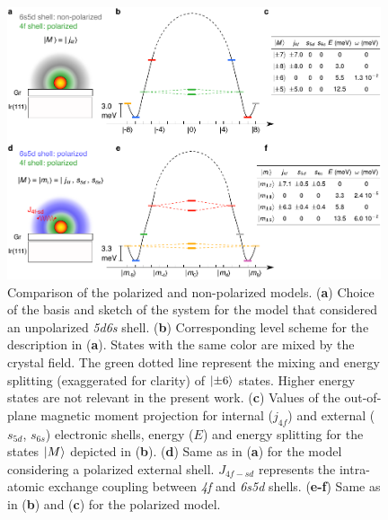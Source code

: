 \documentclass[
reprint,amsmath,amssymb,aps]{revtex4-2}
\begin{document}
\begin{figure}[ht!]
\includegraphics[width=0.98\textwidth]{Fig1_new.pdf}
\caption{Comparison of the polarized and non-polarized models. (\textbf{a}) Choice of the basis and sketch of the system for the model that considered an unpolarized \textit{5d6s} shell. (\textbf{b}) Corresponding level scheme for the description in (\textbf{a}). States with the same color are mixed by the crystal field. The green dotted line represent the mixing and energy splitting (exaggerated for clarity) of $\ket{\pm6}$ states. Higher energy states are not relevant in the present work.  (\textbf{c}) Values of the out-of-plane magnetic moment projection for internal ($j_{4f}$) and external ($s_{5d}$, $s_{6s}$)  electronic shells, energy ($E$) and energy splitting for the states $\ket{M}$ depicted in (\textbf{b}). (\textbf{d}) Same as in (\textbf{a}) for the model considering a polarized external shell. $J_{4f-sd}$ represents the intra-atomic exchange coupling between \textit{4f} and \textit{6s5d} shells. (\textbf{e-f}) Same as in (\textbf{b}) and (\textbf{c}) for the polarized model.
\label{fig:intra} }
\end{figure}
\end{document}
